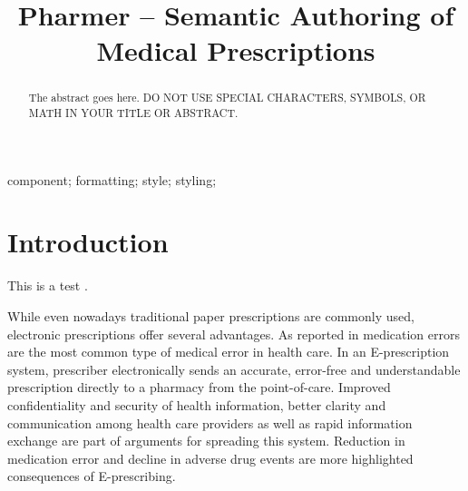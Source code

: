 \documentclass[10pt, conference, compsocconf]{IEEEtran}
\begin{document}
\title{Pharmer -- Semantic Authoring of Medical Prescriptions}



\author{
\and
{}
}


\maketitle

\begin{abstract}
The abstract goes here. DO NOT USE SPECIAL CHARACTERS, SYMBOLS, OR MATH IN YOUR TITLE OR ABSTRACT.

\end{abstract}

\begin{IEEEkeywords}
component; formatting; style; styling;

\end{IEEEkeywords}


\IEEEpeerreviewmaketitle



\section{Introduction}
\label{intro}
This is a test \cite{Khalili2012}.

While even nowadays traditional paper prescriptions are commonly used, electronic prescriptions offer several advantages.
As reported in \cite{} medication errors are the most common type of medical error in health care.
In an E-prescription system, prescriber electronically sends an accurate, error-free and understandable prescription directly to a pharmacy from the point-of-care.
Improved confidentiality and security of health information, better clarity and communication among health care providers as well as rapid information exchange are part of arguments for spreading this system.
Reduction in medication error and decline in adverse drug events are more highlighted consequences of E-prescribing.
\end{document}
